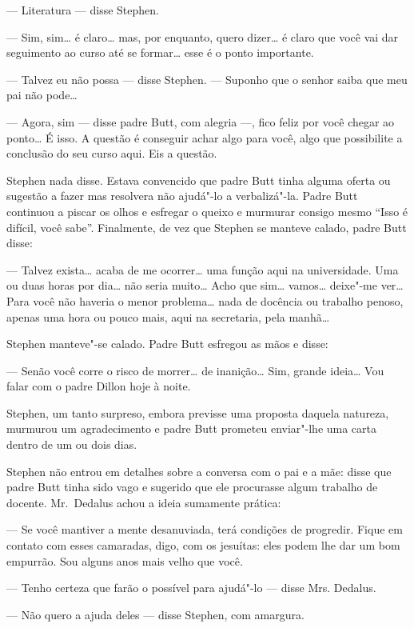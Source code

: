 --- Literatura --- disse Stephen.

--- Sim, sim\ldots{} é claro\ldots{} mas, por enquanto, quero dizer\ldots{} é
claro que você vai dar seguimento ao curso até se formar\ldots{} esse é o
ponto importante.

--- Talvez eu não possa --- disse Stephen.  --- Suponho que o senhor
saiba que meu pai não pode\ldots{}

--- Agora, sim --- disse padre Butt, com alegria ---, fico feliz
por você chegar ao ponto\ldots{}  É isso.  A questão é conseguir achar algo
para você, algo que possibilite a conclusão do seu curso aqui.  Eis a
questão.

Stephen nada disse.  Estava convencido que padre Butt tinha alguma
oferta ou sugestão a fazer mas resolvera não ajudá"-lo a verbalizá"-la. 
Padre Butt continuou a piscar os olhos e esfregar o queixo e murmurar
consigo mesmo “Isso é difícil, você sabe”.  Finalmente, de vez que
Stephen se manteve calado, padre Butt disse:

--- Talvez exista\ldots{} acaba de me ocorrer\ldots{} uma função aqui na
universidade.  Uma ou duas horas por dia\ldots{} não seria muito\ldots{}  Acho
que sim\ldots{} vamos\ldots{} deixe"-me ver\ldots{}  Para você não haveria o menor
problema\ldots{} nada de docência ou trabalho penoso, apenas uma hora ou
pouco mais, aqui na secretaria, pela manhã\ldots{}

Stephen manteve"-se calado.  Padre Butt esfregou as mãos e disse:

--- Senão você corre o risco de morrer\ldots{} de inanição\ldots{}  Sim,
grande ideia\ldots{}  Vou falar com o padre Dillon hoje à noite.

Stephen, um tanto surpreso, embora previsse uma proposta daquela
natureza, murmurou um agradecimento e padre Butt prometeu enviar"-lhe
uma carta dentro de um ou dois dias.

Stephen não entrou em detalhes sobre a conversa com o pai e a mãe:
disse que padre Butt tinha sido vago e sugerido que ele procurasse
algum trabalho de docente.  Mr.~Dedalus achou a ideia sumamente
prática:

--- Se você mantiver a mente desanuviada, terá condições de
progredir.  Fique em contato com esses camaradas, digo, com os
jesuítas: eles podem lhe dar um bom empurrão.  Sou alguns anos mais
velho que você.

--- Tenho certeza que farão o possível para ajudá"-lo --- disse Mrs.
Dedalus.

--- Não quero a ajuda deles --- disse Stephen, com amargura.

